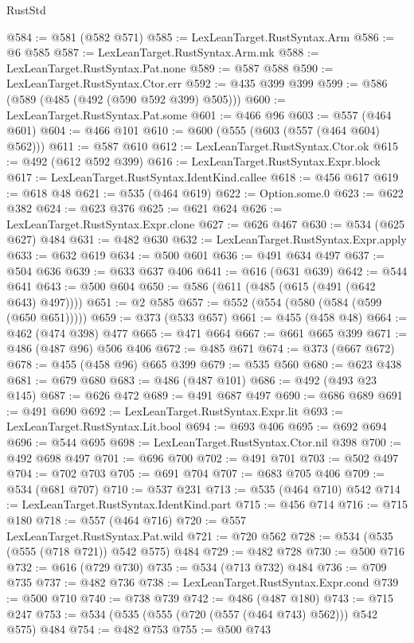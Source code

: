 \begin{lexlean}{RustStd}
\begin{coremodule}
{\begin{coremodule}
{{{{{{{{{{{{{{@584 := @581 (@582 @571)
@585 := LexLeanTarget.RustSyntax.Arm
@586 := @6 @585
@587 := LexLeanTarget.RustSyntax.Arm.mk
@588 := LexLeanTarget.RustSyntax.Pat.none
@589 := @587 @588
@590 := LexLeanTarget.RustSyntax.Ctor.err
@592 := @435 @399 @399
@599 := @586 (@589 (@485 (@492 (@590 @592 @399) @505)))
@600 := LexLeanTarget.RustSyntax.Pat.some
@601 := @466 @96
@603 := @557 (@464 @601)
@604 := @466 @101
@610 := @600 (@555 (@603 (@557 (@464 @604) @562)))
@611 := @587 @610
@612 := LexLeanTarget.RustSyntax.Ctor.ok
@615 := @492 (@612 @592 @399)
@616 := LexLeanTarget.RustSyntax.Expr.block
@617 := LexLeanTarget.RustSyntax.IdentKind.callee
@618 := @456 @617
@619 := @618 @48
@621 := @535 (@464 @619)
@622 := Option.some.{0}
@623 := @622 @382
@624 := @623 @376
@625 := @621 @624
@626 := LexLeanTarget.RustSyntax.Expr.clone
@627 := @626 @467
@630 := @534 (@625 @627) @484
@631 := @482 @630
@632 := LexLeanTarget.RustSyntax.Expr.apply
@633 := @632 @619
@634 := @500 @601
@636 := @491 @634 @497
@637 := @504 @636
@639 := @633 @637 @406
@641 := @616 (@631 @639)
@642 := @544 @641
@643 := @500 @604
@650 := @586 (@611 (@485 (@615 (@491 (@642 @643) @497))))
@651 := @2 @585
@657 := @552 (@554 (@580 (@584 (@599 (@650 @651)))))
@659 := @373 (@533 @657)
@661 := @455 (@458 @48)
@664 := @462 (@474 @398) @477
@665 := @471 @664
@667 := @661 @665 @399
@671 := @486 (@487 @96) @506 @406
@672 := @485 @671
@674 := @373 (@667 @672)
@678 := @455 (@458 @96) @665 @399
@679 := @535 @560
@680 := @623 @438
@681 := @679 @680
@683 := @486 (@487 @101)
@686 := @492 (@493 @23 @145)
@687 := @626 @472
@689 := @491 @687 @497
@690 := @686 @689
@691 := @491 @690
@692 := LexLeanTarget.RustSyntax.Expr.lit
@693 := LexLeanTarget.RustSyntax.Lit.bool
@694 := @693 @406
@695 := @692 @694
@696 := @544 @695
@698 := LexLeanTarget.RustSyntax.Ctor.nil @398
@700 := @492 @698 @497
@701 := @696 @700
@702 := @491 @701
@703 := @502 @497
@704 := @702 @703
@705 := @691 @704
@707 := @683 @705 @406
@709 := @534 (@681 @707)
@710 := @537 @231
@713 := @535 (@464 @710) @542
@714 := LexLeanTarget.RustSyntax.IdentKind.part
@715 := @456 @714
@716 := @715 @180
@718 := @557 (@464 @716)
@720 := @557 LexLeanTarget.RustSyntax.Pat.wild
@721 := @720 @562
@728 := @534 (@535 (@555 (@718 @721)) @542 @575) @484
@729 := @482 @728
@730 := @500 @716
@732 := @616 (@729 @730)
@735 := @534 (@713 @732) @484
@736 := @709 @735
@737 := @482 @736
@738 := LexLeanTarget.RustSyntax.Expr.cond
@739 := @500 @710
@740 := @738 @739
@742 := @486 (@487 @180)
@743 := @715 @247
@753 := @534 (@535 (@555 (@720 (@557 (@464 @743) @562))) @542 @575) @484
@754 := @482 @753
@755 := @500 @743
}}}}}}}}}}}}}}
\end{coremodule}}
\end{coremodule}
\end{lexlean}
